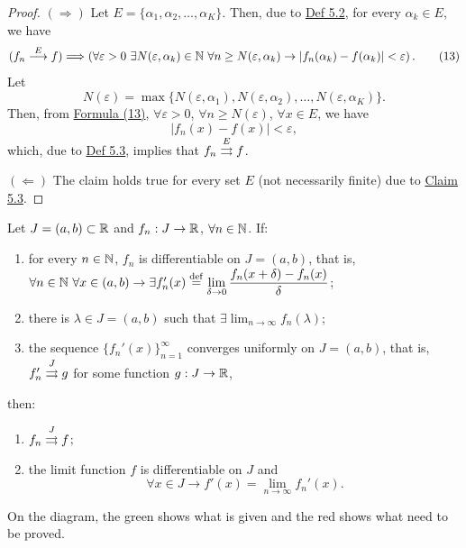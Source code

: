 \begin{proof}
$(\Rightarrow)$ Let $E=\{\alpha_1,\alpha_2,\ldots,\alpha_K\}$.
Then, due to \hyperref[def:5.2]{Def 5.2}, for every $\alpha_k\in E$, we have
\[
(f_n\pconv{E}f)
\Longrightarrow
\left(\forall\varepsilon>0\ \exists N(\varepsilon,\alpha_k)\in\N\ \forall n\geq N(\varepsilon,\alpha_k)
\to |f_n(\alpha_k)-f(\alpha_k)|<\varepsilon\right).
\tag{13}\label{eq:6:13:1}
\]
Let
\[
N(\varepsilon)=\max\{N(\varepsilon,\alpha_1),N(\varepsilon,\alpha_2),\ldots,N(\varepsilon,\alpha_K)\}.
\]
Then, from \hyperref[eq:6:13:1]{Formula (13)}, $\forall\varepsilon>0$, $\forall n\geq N(\varepsilon)$, $\forall x\in E$, we have
\[
|f_n(x)-f(x)|<\varepsilon,
\]
which, due to \hyperref[def:5.3]{Def 5.3}, implies that $f_n\mathrel{\overset{E}{\rightrightarrows}}f$.

$(\Leftarrow)$ The claim holds true for every set $E$ (not necessarily finite) due to \hyperref[claim:5.3]{Claim 5.3}.
\end{proof}

\begin{claim}\label{claim:6.10}
Let $J=(a,b)\subset\mathbb{R}$ and $f_n:J\to\mathbb{R}$, $\forall n\in\mathbb{N}$.
If:
\begin{enumerate}[label=\alph*)]
    \item\label{item:claim:6.10:a} for every $n\in\mathbb{N}$, $f_n$ is differentiable on $J=(a,b)$, that is, $\forall n\in\mathbb{N}\ \forall x\in(a,b)\to \exists f_n'(x)\overset{\mathrm{def}}{=}\displaystyle\lim_{\delta\to0}\frac{f_n(x+\delta)-f_n(x)}{\delta}$;
    \item\label{item:claim:6.10:b} there is $\lambda\in J=(a,b)$ such that $\exists\displaystyle\lim_{n\to\infty}f_n(\lambda)$;
    \item\label{item:claim:6.10:c} the sequence $\{f_n'(x)\}_{n=1}^{\infty}$ converges uniformly on $J=(a,b)$, that is, $f_n'\mathrel{\overset{J}{\rightrightarrows}}g$ for some function $g:J\to\mathbb{R}$,
\end{enumerate}
then:
\begin{enumerate}
    \item\label{item:claim:6.10:1} $f_n\mathrel{\overset{J}{\rightrightarrows}}f$;
    \item\label{item:claim:6.10:2} the limit function $f$ is differentiable on $J$ and
    \[
    \forall x\in J\to f'(x)=\lim_{n\to\infty}f_n'(x).
    \]
\end{enumerate}
\end{claim}

On the diagram, the green shows what is given and the red shows what need to be proved.

